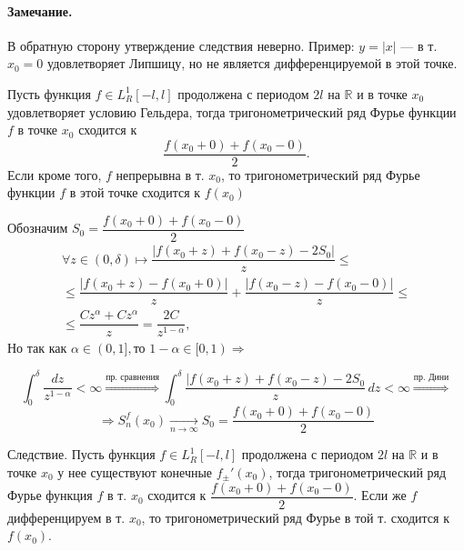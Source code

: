 \paragraph{Замечание.} В обратную сторону утверждение следствия неверно. Пример: $ y = |x| $ --- в т. $ x_0=0 $ удовлетворяет Липшицу, но не является дифференцируемой в этой точке.
\begin{greyTheorem}
	Пусть функция $ f \in L_R^1[-l,l] $ продолжена с периодом $ 2l $ на $ \mathbb{R} $ и в точке $ x_0 $ удовлетворяет условию Гельдера, тогда тригонометрический ряд Фурье функции $ f $  в точке $ x_0 $ сходится к $$ \dfrac{f(x_0+0)+f(x_0-0)}{2}. $$ Если кроме того, $ f $ непрерывна в т. $ x_0 $, то тригонометрический ряд \mbox{Фурье} функции $ f $ в этой точке сходится к $ f(x_0) $
\end{greyTheorem}
\begin{greyProof}
	Обозначим $ S_0 = \dfrac{f(x_0+0) + f(x_0-0)}{2} $
	\begin{multline*}
		\forall z \in (0,\delta) \mapsto \dfrac{\left| f(x_0+z) + f(x_0-z)-2S_0 \right|}{z} \leqslant \\ \leqslant \dfrac{\left| f(x_0+z) - f(x_0+0) \right|}{z} + \dfrac{\left| f(x_0-z) - f(x_0 - 0)\right|}{z}\leqslant \\ \leqslant \dfrac{Cz^\alpha + Cz^\alpha}{z} = \dfrac{2C}{z^{1-\alpha}},
	\end{multline*}
	Но так как $\alpha \in (0,1],\text{то } 1-\alpha \in [0,1) \Rightarrow $
	
	$$  \int_{0}^\delta \dfrac{dz}{z^{1-\alpha}}<\infty \overset{\text{пр. сравнения}}{\Longrightarrow}\int_{0}^\delta \dfrac{|f(x_0+z) + f(x_0-z) - 2S_0}{z}\, dz < \infty \overset{\text{пр. Дини}}{\Longrightarrow}$$
	\[ \Rightarrow S_n^f(x_0) \underset{n\rightarrow \infty}{\longrightarrow} S_0 = \dfrac{f(x_0+0)+ f(x_0-0)}{2} \]
\end{greyProof}
\begin{greySmth}{Следствие.} Пусть функция $ f \in L_R^1[-l,l] $ продолжена с периодом $ 2l $ на $ \mathbb{R} $ и в точке $ x_0 $ у нее существуют конечные $ f_\pm'(x_0) $, тогда тригонометрический ряд Фурье функция $ f $ в т. $ x_0 $ сходится к $ \dfrac{f(x_0+0) + f(x_0-0)}{2} $. Если же $ f $ дифференцируем в т. $ x_0 $, то тригонометрический ряд Фурье в той т. сходится к $ f(x_0) $.
\end{greySmth}